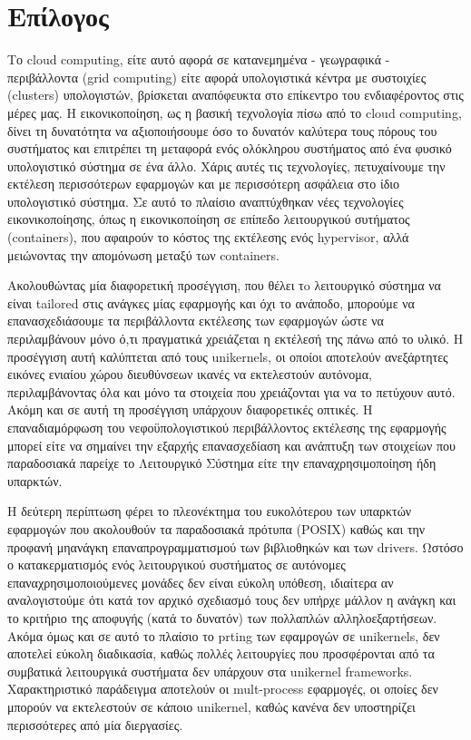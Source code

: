 \chapter{Επίλογος}
\label{chap:conclusion}
Το cloud computing, είτε αυτό αφορά σε κατανεμημένα - γεωγραφικά - περιβάλλοντα
(grid computing) είτε αφορά υπολογιστικά κέντρα με συστοιχίες (clusters)
υπολογιστών, βρίσκεται αναπόφευκτα στο επίκεντρο του ενδιαφέροντος στις μέρες
μας. Η εικονικοποίηση, ως η βασική τεχνολογία πίσω από το cloud computing, δίνει
τη δυνατότητα να αξιοποιήσουμε όσο το δυνατόν καλύτερα τους πόρους του
συστήματος και επιτρέπει τη μεταφορά ενός ολόκληρου συστήματος από ένα φυσικό
υπολογιστικό σύστημα σε ένα άλλο. Χάρις αυτές τις τεχνολογίες, πετυχαίνουμε την
εκτέλεση περισσότερων εφαρμογών και με περισσότερη ασφάλεια στο ίδιο
υπολογιστικό σύστημα. Σε αυτό το πλαίσιο αναπτύχθηκαν νέες τεχνολογίες
εικονικοποίησης, όπως η εικονικοποίηση σε επίπεδο λειτουργικού συτήματος
(containers), που αφαιρούν το κόστος της εκτέλεσης ενός hypervisor, αλλά
μειώνοντας την απομόνωση μεταξύ των containers.


Ακολουθώντας μία διαφορετική προσέγγιση, που θέλει τo λειτουργικό σύστημα να
είναι tailored στις ανάγκες μίας εφαρμογής και όχι το ανάποδο, μπορούμε να
επανασχεδιάσουμε τα περιβάλλοντα εκτέλεσης των εφαρμογών ώστε να περιλαμβάνουν
μόνο ό,τι πραγματικά χρειάζεται η εκτέλεσή της πάνω από το υλικό. Η προσέγγιση
αυτή καλύπτεται από τους unikernels, οι οποίοι αποτελούν ανεξάρτητες εικόνες
ενιαίου χώρου διευθύνσεων ικανές να εκτελεστούν αυτόνομα, περιλαμβάνοντας όλα
και μόνο τα στοιχεία που χρειάζονται για να το πετύχουν αυτό. Ακόμη και σε αυτή
τη προσέγγιση υπάρχουν διαφορετικές οπτικές. Η επαναδιαμόρφωση του
νεφοϋπολογιστικού περιβάλλοντος εκτέλεσης της εφαρμογής μπορεί είτε να σημαίνει
την εξαρχής επανασχεδίαση και ανάπτυξη των στοιχείων που παραδοσιακά παρείχε το
Λειτουργικό Σύστημα είτε την επαναχρησιμοποίηση ήδη υπαρκτών.

Η δεύτερη περίπτωση φέρει το πλεονέκτημα του ευκολότερου  των υπαρκτών
εφαρμογών που ακολουθούν τα παραδοσιακά πρότυπα (POSIX) καθώς και την προφανή
μηανάγκη επαναπρογραμματισμού των βιβλιοθηκών και των drivers. Ωστόσο ο
κατακερματισμός ενός λειτουργικού συστήματος σε αυτόνομες επαναχρησιμοποιούμενες
μονάδες δεν είναι εύκολη υπόθεση, ιδιαίτερα αν αναλογιστούμε ότι κατά τον αρχικό
σχεδιασμό τους δεν υπήρχε μάλλον η ανάγκη και το κριτήριο της αποφυγής (κατά το
δυνατόν) των πολλαπλών αλληλοεξαρτήσεων. Ακόμα όμως και σε αυτό το πλαίσιο το
prting των εφαμρογών σε unikernels, δεν αποτελεί εύκολη διαδικασία, καθώς πολλές
λειτουργίες που προσφέρονται από τα συμβατικά λειτουργικά συστήματα δεν υπάρχουν
στα unikernel frameworks. Χαρακτηριστικό παράδειγμα αποτελούν οι mult-process
εφαρμογές, οι οποίες δεν μπορούν να εκτελεστούν σε κάποιο unikernel, καθώς
κανένα δεν υποστηρίζει περισσότερες από μία διεργασίες.

